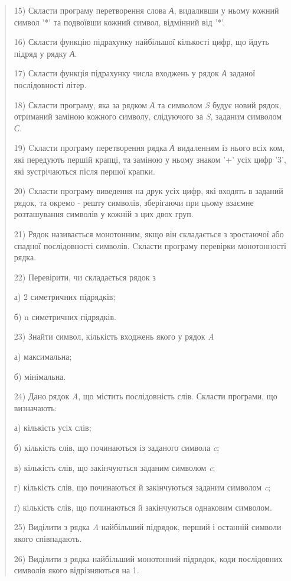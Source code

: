 \documentclass[]{article}
\begin{document}
\begin{quote}
15) Скласти програму перетворення слова \emph{А}, видаливши у ньому
кожний символ '*' та подвоївши кожний символ, відмінний від '*'.

16) Скласти функцію підрахунку найбільшої кількості цифр, що йдуть
підряд у рядку \emph{А}.

17) Скласти функція підрахунку числа входжень у рядок \emph{А} заданої
послідовності літер.

18) Скласти програму, яка за рядком \emph{А} та символом \emph{S} будує
новий рядок, отриманий заміною кожного символу, слідуючого за \emph{S},
заданим символом \emph{С}.

19) Cкласти програму перетворення рядка \emph{А} видаленням із нього
всіх ком, які передують першій крапці, та заміною у ньому знаком '+'
усіх цифр '3', які зустрічаються після першої крапки.

20) Cкласти програму виведення на друк усіх цифр, які входять в заданий
рядок, та окремо - решту символів, зберігаючи при цьому взаємне
розташування символів у кожній з цих двох груп.

21) Рядок називається монотонним, якщо він складається з зростаючої або
спадної послідовності символів. Cкласти програму перевірки монотонності
рядка.

22) Перевірити, чи складається рядок з

а) 2 симетричних підрядків;

б) n симетричних підрядків.

23) Знайти символ, кількість входжень якого у рядок \emph{A}

а) максимальна;

б) мінімальна.

24) Дано рядок \emph{A}, що містить послідовність слів. Скласти
програми, що визначають:

а) кількість усіх слів;

б) кількість слів, що починаються із заданого символа \emph{c};

в) кількість слів, що закінчуються заданим символом \emph{c};

г) кількість слів, що починаються й закінчуються заданим символом
\emph{c};

ґ) кількість слів, що починаються й закінчуються однаковим символом.

25) Виділити з рядка \emph{A} найбільший підрядок, перший і останній
символи якого співпадають.

26) Виділити з рядка найбільший монотонний підрядок, коди послідовних
символів якого відрізняються на 1.


\end{quote}
\end{document}

